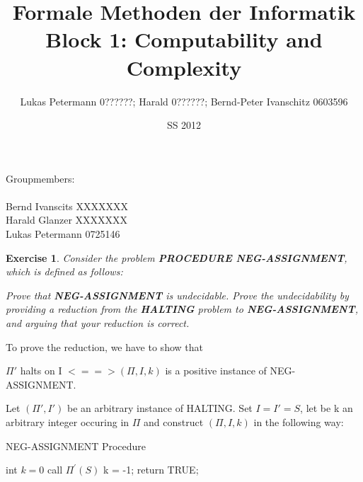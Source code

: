 \documentclass [11pt]{article}
\title{Formale Methoden der Informatik \\
Block 1: Computability and Complexity }
\author{Lukas Petermann 0??????; Harald 0??????; Bernd-Peter Ivanschitz 0603596}
\date{SS 2012}
\newtheorem{exercise}[theorem]{Exercise}
\newcommand{\solution}[1]{\noindent {\bf Solution.}  #1}
\begin{document}
\maketitle

Groupmembers:\\
\\
Bernd Ivanscits XXXXXXX\\
Harald Glanzer XXXXXXX\\
Lukas Petermann 0725146\\

\begin{exercise}
  Consider the problem \textbf{PROCEDURE NEG-ASSIGNMENT}, which is defined
  as follows:

  \begin{center}
  \end{center}
  Prove that \textbf{NEG-ASSIGNMENT} is undecidable. Prove the undecidability
  by providing a reduction from the \textbf{HALTING} problem to
  \textbf{NEG-ASSIGNMENT}, and arguing that your reduction is correct.
\end{exercise}


\solution

To prove the reduction, we have to show that 

\bigskip

$\Pi'$ halts on I $<==>(\Pi, I, k)$ is a positive instance of NEG-ASSIGNMENT.

\bigskip

Let $(\Pi', I') $ be an arbitrary instance of HALTING.  Set $I = I' = S $, let be k an arbitrary integer occuring in $\Pi$ and  construct $(\Pi, I, k) $ in the following way: 

\smallskip


\begin{algorithm}
\caption{NEG-ASSIGNMENT Procedure}
\label{<your label for references later in your document>}
\begin{algorithmic}

 \State int $k = 0$
 \State call $\Pi^\prime(S)$
 \State k = -1;
 \State return TRUE;
\EndFunction

\end{algorithmic}
\end{algorithm}
\end{document}
